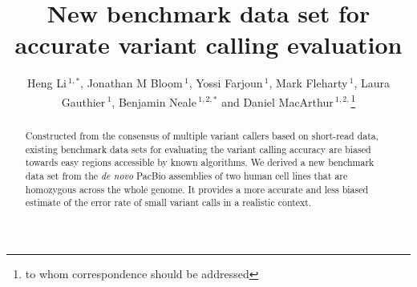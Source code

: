 \documentclass{bioinfo}
\begin{document}

\title[Evaluating small variant calling]{New benchmark data set for accurate variant calling evaluation}

\author[Li et al]{Heng Li\,$^{1,*}$, Jonathan M Bloom\,$^1$, Yossi Farjoun\,$^1$, Mark
  Fleharty\,$^1$, Laura Gauthier\,$^1$, Benjamin Neale\,$^{1,2,*}$ and Daniel
  MacArthur\,$^{1,2,}$\footnote{to whom correspondence should be addressed}}

\address{$^1$Broad Institute of Harvard and MIT, Cambridge, MA 02142, USA\\
$^2$Analytic and Translational Genetics Unit, Massachusetts General Hospital, Boston, MA 02114, USA}

\maketitle

\begin{abstract}

Constructed from the consensus of multiple variant callers based on short-read
data, existing benchmark data sets for evaluating the variant calling accuracy
are biased towards easy regions accessible by known algorithms.  We derived a
new benchmark data set from the \emph{de novo} PacBio assemblies of two human
cell lines that are homozygous across the whole genome. It provides a more
accurate and less biased estimate of the error rate of small variant calls in a
realistic context.

\end{abstract}
\end{document}

